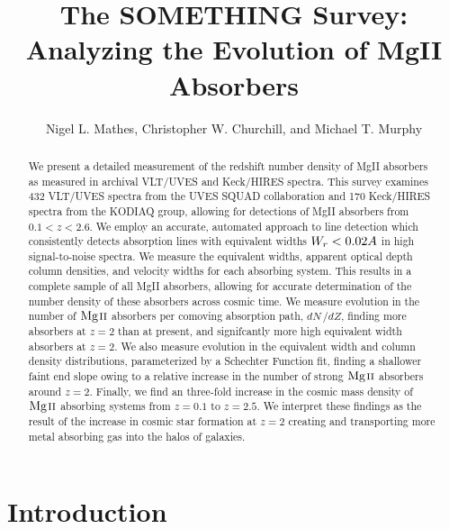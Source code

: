 \documentclass[iop,apj,numberedappendix,appendixfloats,twocolappendix]{emulateapj}
\begin{document}
\title{The SOMETHING Survey: Analyzing the Evolution of MgII Absorbers}

\author{
Nigel L. Mathes,
Christopher W. Churchill,
and
Michael T. Murphy
}


\begin{abstract}
We present a detailed measurement of the redshift number density of MgII absorbers as measured in archival VLT/UVES and Keck/HIRES spectra. This survey examines 432 VLT/UVES spectra from the UVES SQUAD collaboration and 170 Keck/HIRES spectra from the KODIAQ group, allowing for detections of MgII absorbers from $0.1 < z < 2.6$. We employ an accurate, automated approach to line detection which consistently detects absorption lines with equivalent widths $W_r < 0.02\AA$ in high signal-to-noise spectra. We measure the equivalent widths, apparent optical depth column densities, and velocity widths for each absorbing system. This results in a complete sample of all MgII absorbers, allowing for accurate determination of the number density of these absorbers across cosmic time. We measure evolution in the number of ${\hbox{{\rm Mg}\kern 0.1em{\sc ii}}}$ absorbers per comoving absorption path, $dN\,/dZ$, finding more absorbers at $z = 2$ than at present, and signifcantly more high equivalent width absorbers at $z = 2$. We also measure evolution in the equivalent width and column density distributions, parameterized by a Schechter Function fit, finding a shallower faint end slope owing to a relative increase in the number of strong ${\hbox{{\rm Mg}\kern 0.1em{\sc ii}}}$ absorbers around $z = 2$. Finally, we find an three-fold increase in the cosmic mass density of ${\hbox{{\rm Mg}\kern 0.1em{\sc ii}}}$ absorbing systems from $z = 0.1$ to $z = 2.5$. We interpret these findings as the result of the increase in cosmic star formation at $z = 2$ creating and transporting more metal absorbing gas into the halos of galaxies.

\end{abstract}



\section{Introduction}
\label{sec:intro}
\end{document}
